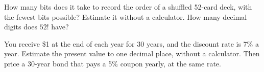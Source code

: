 \begin{question}\label{iq:iv1:mental-technique:39}
How many bits does it take to record the order of a shuffled 52-card deck, with the fewest bits possible? Estimate it without a calculator. How many decimal digits does $52!$ have?
\end{question}

\begin{question}\label{iq:iv1:mental-technique:40}
You receive \$1 at the end of each year for 30 years, and the discount rate is 7\% a year. Estimate the present value to one decimal place, without a calculator. Then price a 30-year bond that pays a 5\% coupon yearly, at the same rate.
\end{question}
